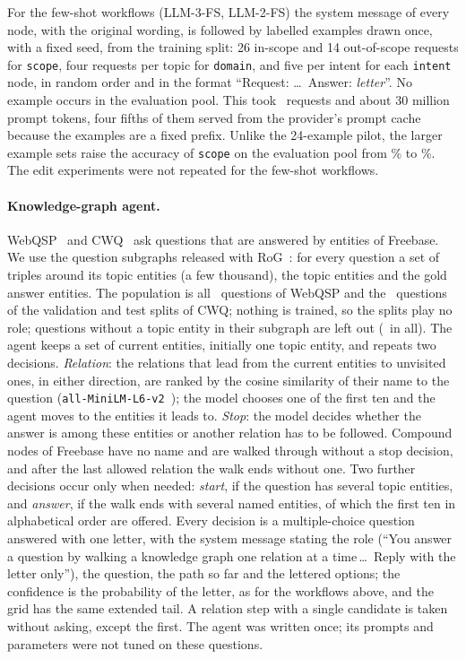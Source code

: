 For the few-shot workflows (LLM-3-FS, LLM-2-FS) the system message of every node, with the
original wording, is followed by labelled examples drawn once, with a fixed seed, from the
training split: 26 in-scope and 14 out-of-scope requests for \texttt{scope}, four requests
per topic for \texttt{domain}, and five per intent for each \texttt{intent} node, in random
order and in the format ``Request: \dots\ Answer: \emph{letter}''. No example occurs in the
evaluation pool. This took \LlmFsRequests\ requests and about 30 million prompt tokens, four
fifths of them served from the provider's prompt cache because the examples are a fixed
prefix. Unlike the 24-example pilot, the larger example sets raise the accuracy of
\texttt{scope} on the evaluation pool from \LlmRootAccT\% to \LlmRootAccG\%. The edit
experiments were not repeated for the few-shot workflows.

\paragraph{Knowledge-graph agent.} WebQSP~\citep{yih2016webqsp} and CWQ~\citep{talmor2018cwq}
ask questions that are answered by entities of Freebase. We use the question subgraphs
released with RoG~\citep{luo2024rog}: for every question a set of triples around its topic
entities (a few thousand), the topic entities and the gold answer entities.
The population is all \AgentSizeW\ questions of WebQSP and the \AgentSizeQ\ questions of the
validation and test splits of CWQ; nothing is trained, so the splits play no role;
questions without a topic entity in their subgraph are left out (\AgentSkipped\ in all). The agent keeps a
set of current entities, initially one topic entity, and repeats two decisions. \emph{Relation}:
the relations that lead from the current entities to unvisited ones, in either direction, are
ranked by the cosine similarity of their name to the question
(\texttt{all-MiniLM-L6-v2}~\citep{reimers2019sbert}); the model chooses one of the first ten
and the agent moves to the entities it leads to. \emph{Stop}: the model decides whether the
answer is among these entities or another relation has to be followed. Compound nodes of
Freebase have no name and are walked through without a stop decision, and after the last
allowed relation the walk ends without one. Two further decisions occur only when needed:
\emph{start}, if the question has several topic entities, and \emph{answer}, if the walk ends
with several named entities, of which the first ten in alphabetical order are offered. Every
decision is a multiple-choice question answered with one letter, with the system message
stating the role (``You answer a question by walking a knowledge graph one relation at a
time\,\dots\ Reply with the letter only''), the question, the path so far and the lettered
options; the confidence is the probability of the letter, as for the workflows above, and the
grid has the same extended tail. A relation step with a single candidate is taken without
asking, except the first. The agent was written once; its prompts and parameters were not tuned on these questions.

